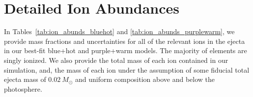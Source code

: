 \documentclass[twocolumn, twocolappendix]{aastex63}
\begin{document}
\section{Detailed Ion Abundances}\label{app:ion_abunds}

In Tables~\ref{tab:ion_abunds_bluehot} and \ref{tab:ion_abunds_purplewarm}, we provide mass fractions and uncertainties for all of the relevant ions in the ejecta in our best-fit blue+hot and purple+warm models. The majority of elements are singly ionized. We also provide the total mass of each ion contained in our simulation, and, the mass of each ion under the assumption of some fiducial total ejecta mass of $0.02~M_{\odot}$ and uniform composition above and below the photosphere.
\end{document}
